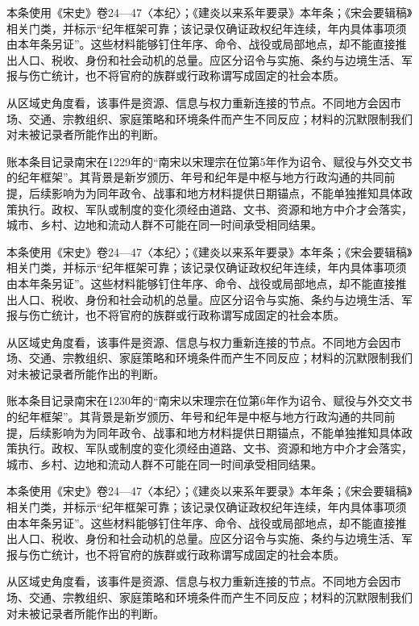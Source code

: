 本条使用《宋史》卷24—47〈本纪〉；《建炎以来系年要录》本年条；《宋会要辑稿》相关门类，并标示“纪年框架可靠；该记录仅确证政权纪年连续，年内具体事项须由本年条另证”。这些材料能够钉住年序、命令、战役或局部地点，却不能直接推出人口、税收、身份和社会动机的总量。应区分诏令与实施、条约与边境生活、军报与伤亡统计，也不将官府的族群或行政称谓写成固定的社会本质。

从区域史角度看，该事件是资源、信息与权力重新连接的节点。不同地方会因市场、交通、宗教组织、家庭策略和环境条件而产生不同反应；材料的沉默限制我们对未被记录者所能作出的判断。

账本条目记录南宋在1229年的“南宋以宋理宗在位第5年作为诏令、赋役与外交文书的纪年框架”。其背景是新岁颁历、年号和纪年是中枢与地方行政沟通的共同前提，后续影响为为同年政令、战事和地方材料提供日期锚点，不能单独推知具体政策执行。政权、军队或制度的变化须经由道路、文书、资源和地方中介才会落实，城市、乡村、边地和流动人群不可能在同一时间承受相同结果。

本条使用《宋史》卷24—47〈本纪〉；《建炎以来系年要录》本年条；《宋会要辑稿》相关门类，并标示“纪年框架可靠；该记录仅确证政权纪年连续，年内具体事项须由本年条另证”。这些材料能够钉住年序、命令、战役或局部地点，却不能直接推出人口、税收、身份和社会动机的总量。应区分诏令与实施、条约与边境生活、军报与伤亡统计，也不将官府的族群或行政称谓写成固定的社会本质。

从区域史角度看，该事件是资源、信息与权力重新连接的节点。不同地方会因市场、交通、宗教组织、家庭策略和环境条件而产生不同反应；材料的沉默限制我们对未被记录者所能作出的判断。

账本条目记录南宋在1230年的“南宋以宋理宗在位第6年作为诏令、赋役与外交文书的纪年框架”。其背景是新岁颁历、年号和纪年是中枢与地方行政沟通的共同前提，后续影响为为同年政令、战事和地方材料提供日期锚点，不能单独推知具体政策执行。政权、军队或制度的变化须经由道路、文书、资源和地方中介才会落实，城市、乡村、边地和流动人群不可能在同一时间承受相同结果。

本条使用《宋史》卷24—47〈本纪〉；《建炎以来系年要录》本年条；《宋会要辑稿》相关门类，并标示“纪年框架可靠；该记录仅确证政权纪年连续，年内具体事项须由本年条另证”。这些材料能够钉住年序、命令、战役或局部地点，却不能直接推出人口、税收、身份和社会动机的总量。应区分诏令与实施、条约与边境生活、军报与伤亡统计，也不将官府的族群或行政称谓写成固定的社会本质。

从区域史角度看，该事件是资源、信息与权力重新连接的节点。不同地方会因市场、交通、宗教组织、家庭策略和环境条件而产生不同反应；材料的沉默限制我们对未被记录者所能作出的判断。

